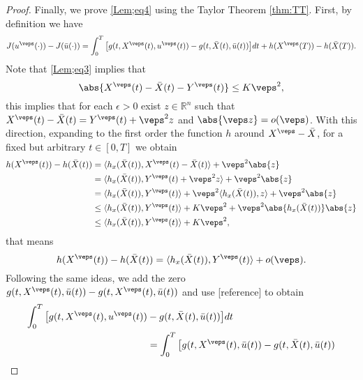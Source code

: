 \begin{proof}
    Finally, we prove \cref{Lem;eq4}  using the Taylor Theorem \eqref{thm:TT}. First, by definition
    we have
    \begin{equation*}
        J(u^{\veps}(\cdot)) - J(\Bar{u}(\cdot)) = \int_{0}^{T}\big[ g(t, X^{\veps}(t), u^{\veps}(t)) %
            - g(t, \Bar{X}(t), \Bar{u}(t)) \big] dt + h(X^{\veps}(T)) - h(\Bar{X}(T)).
    \end{equation*}
    Note that \cref{Lem;eq3} implies that
    \begin{equation*}
        \abs{X^{\veps}(t) - \Bar{X}(t) - Y^{\veps}(t)} \leq K\veps^2,
    \end{equation*}
    this implies that for each $\epsilon > 0$ exist $z \in \mathbb{R}^{n}$ such
    that $X^{\veps}(t) - \Bar{X}(t) = Y^{\veps}(t) + \veps^{2}z$ and  
    $\abs{\veps z} = o(\veps)$. With this direction, expanding to the first
    order the function $h$ around $X^{\veps} - \Bar{X}$, for a fixed but 
    arbitrary $t \in [0,T]$ we obtain
    \begin{align*}
        h(X^{\veps}(t)) - h(\Bar{X}(t)) %
        &=  \langle h_{x}(\Bar{X}(t)), X^{\veps}(t) - \Bar{X}(t) \rangle + \veps^2 \abs{z} \\
        &=  \langle h_{x}(\Bar{X}(t)), Y^{\veps}(t) + \veps^2 z \rangle + \veps^2 \abs{z}  \\
        &=  \langle h_{x}(\Bar{X}(t)), Y^{\veps}(t)\rangle + %
            \veps^2 \langle h_{x}(\Bar{X}(t)), z \rangle + \veps^2 \abs{z}  \\
        &\leq \langle h_{x}(\Bar{X}(t)), Y^{\veps}(t)\rangle  + K\veps^2 + %
            \veps^2\abs{ h_{x}(\Bar{X}(t))}\abs{z} \\
        &\leq \langle h_{x}(\Bar{X}(t)), Y^{\veps}(t)\rangle + K \veps^2,
    \end{align*}
    that means
    \begin{equation*}
         h(X^{\veps}(t)) - h(\Bar{X}(t)) = \langle h_{x}(\Bar{X}(t)), Y^{\veps}(t)\rangle %
            + o(\veps).
    \end{equation*}
    Following the same ideas, we add the zero $g(t, X^{\veps}(t), \Bar{u}(t)) - %
    g(t, X^{\veps}(t), \Bar{u}(t))$ and use [reference] to obtain
    \begin{align*}
        \int_{0}^{T}\big[ g(t, X^{\veps}(t), u^{\veps}(t)) 
        & - g(t, \Bar{X}(t), \Bar{u}(t)) \big] dt %
        \\
        & = \int_{0}^{T}\big[ g(t, X^{\veps}(t), \Bar{u}(t)) - g(t, \Bar{X}(t), \Bar{u}(t)) 
        \\

\end{align*}
\end{proof}
